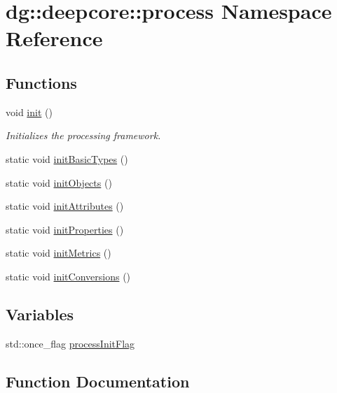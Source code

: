 \hypertarget{namespacedg_1_1deepcore_1_1process}{}\section{dg\+:\+:deepcore\+:\+:process Namespace Reference}
\label{namespacedg_1_1deepcore_1_1process}
\subsection*{Functions}
\begin{DoxyCompactItemize}
\item 
void \hyperlink{namespacedg_1_1deepcore_1_1process_a93462210510d131ae36a02db8fc6f615}{init} ()
\begin{DoxyCompactList}\small\item\em Initializes the processing framework. \end{DoxyCompactList}\item 
static void \hyperlink{namespacedg_1_1deepcore_1_1process_abbc9d289005c83b20554a77b25e98c81}{init\+Basic\+Types} ()
\item 
static void \hyperlink{namespacedg_1_1deepcore_1_1process_a34e73c00e5fda3fc6af04df1911eebf3}{init\+Objects} ()
\item 
static void \hyperlink{namespacedg_1_1deepcore_1_1process_a6066e12fecb3771135ba665ad310016a}{init\+Attributes} ()
\item 
static void \hyperlink{namespacedg_1_1deepcore_1_1process_a0678f400e1d263cb86ee8928d5265528}{init\+Properties} ()
\item 
static void \hyperlink{namespacedg_1_1deepcore_1_1process_aad7e59f71460f7fa92839db2e1c5551a}{init\+Metrics} ()
\item 
static void \hyperlink{namespacedg_1_1deepcore_1_1process_a3eb64b317df33473c56282b5e770720d}{init\+Conversions} ()
\end{DoxyCompactItemize}
\subsection*{Variables}
\begin{DoxyCompactItemize}
\item 
std\+::once\+\_\+flag \hyperlink{namespacedg_1_1deepcore_1_1process_a03fe120762ea61445bb10cd8f9617b4e}{process\+Init\+Flag}
\end{DoxyCompactItemize}


\subsection{Function Documentation}
